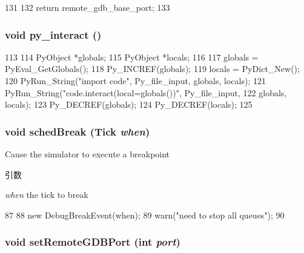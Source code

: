 \begin{DoxyCode}
131 {
132     return remote_gdb_base_port;
133 }
\end{DoxyCode}
\hypertarget{sim_2debug_8hh_a11045488b3a5d8e441765810c10272eb}{
\subsubsection[{py\_\-interact}]{\setlength{\rightskip}{0pt plus 5cm}void py\_\-interact ()}}
\label{sim_2debug_8hh_a11045488b3a5d8e441765810c10272eb}



\begin{DoxyCode}
113 {
114     PyObject *globals;
115     PyObject *locals;
116 
117     globals = PyEval_GetGlobals();
118     Py_INCREF(globals);
119     locals = PyDict_New();
120     PyRun_String("import code", Py_file_input, globals, locals);
121     PyRun_String("code.interact(local=globals())", Py_file_input,
122                  globals, locals);
123     Py_DECREF(globals);
124     Py_DECREF(locals);
125 }
\end{DoxyCode}
\hypertarget{sim_2debug_8hh_a4c79c8ce91cdbeb5e36a2f9ec71f4e73}{
\subsubsection[{schedBreak}]{\setlength{\rightskip}{0pt plus 5cm}void schedBreak ({\bf Tick} {\em when})}}
\label{sim_2debug_8hh_a4c79c8ce91cdbeb5e36a2f9ec71f4e73}
Cause the simulator to execute a breakpoint 
\begin{DoxyParams}{引数}
\item[{\em when}]the tick to break \end{DoxyParams}



\begin{DoxyCode}
87 {
88     new DebugBreakEvent(when);
89     warn("need to stop all queues");
90 }
\end{DoxyCode}
\hypertarget{sim_2debug_8hh_a6ff050ba197ef015254b723272affd53}{
\subsubsection[{setRemoteGDBPort}]{\setlength{\rightskip}{0pt plus 5cm}void setRemoteGDBPort (int {\em port})}}
\label{sim_2debug_8hh_a6ff050ba197ef015254b723272affd53}



